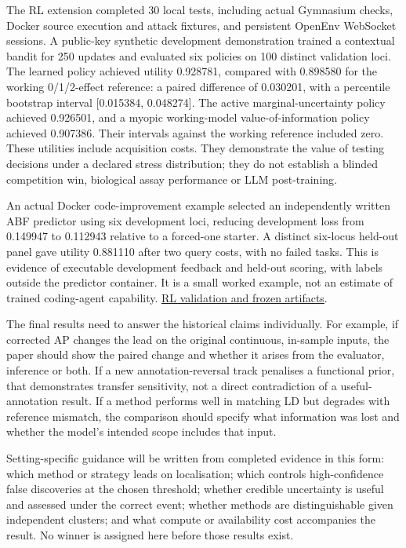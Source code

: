 \documentclass[
  british,
  10pt,
]{article}
\begin{document}
The RL extension completed 30 local tests, including actual Gymnasium
checks, Docker source execution and attack fixtures, and persistent
OpenEnv WebSocket sessions. A public-key synthetic development
demonstration trained a contextual bandit for 250 updates and evaluated
six policies on 100 distinct validation loci. The learned policy
achieved utility 0.928781, compared with 0.898580 for the working
0/1/2-effect reference: a paired difference of 0.030201, with a
percentile bootstrap interval {[}0.015384, 0.048274{]}. The active
marginal-uncertainty policy achieved 0.926501, and a myopic
working-model value-of-information policy achieved 0.907386. Their
intervals against the working reference included zero. These utilities
include acquisition costs. They demonstrate the value of testing
decisions under a declared stress distribution; they do not establish a
blinded competition win, biological assay performance or LLM
post-training.

An actual Docker code-improvement example selected an independently
written ABF predictor using six development loci, reducing development
loss from 0.149947 to 0.112943 relative to a forced-one starter. A
distinct six-locus held-out panel gave utility 0.881110 after two query
costs, with no failed tasks. This is evidence of executable development
feedback and held-out scoring, with labels outside the predictor
container. It is a small worked example, not an estimate of trained
coding-agent capability. \href{../rl_envs/docs/validation.md}{RL
validation and frozen artifacts}.

The final results need to answer the historical claims individually. For
example, if corrected AP changes the lead on the original continuous,
in-sample inputs, the paper should show the paired change and whether it
arises from the evaluator, inference or both. If a new
annotation-reversal track penalises a functional prior, that
demonstrates transfer sensitivity, not a direct contradiction of a
useful-annotation result. If a method performs well in matching LD but
degrades with reference mismatch, the comparison should specify what
information was lost and whether the model's intended scope includes
that input.

Setting-specific guidance will be written from completed evidence in
this form: which method or strategy leads on localisation; which
controls high-confidence false discoveries at the chosen threshold;
whether credible uncertainty is useful and assessed under the correct
event; whether methods are distinguishable given independent clusters;
and what compute or availability cost accompanies the result. No winner
is assigned here before those results exist.
\end{document}
